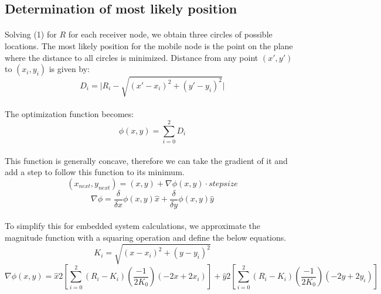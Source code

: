 \documentclass[10pt,letterpaper]{article}
\begin{document}
\subsection*{Determination of most likely position}
\paragraph*{}Solving (1) for $R$ for each receiver node, we obtain three circles of possible locations.  The most likely position for the mobile node is the point on the plane where the distance to all circles is minimized.  Distance from any point $(x',y')$ to $(x_{i},y_{i})$ is given by:
\begin{equation}
D_{i} = \vert R_{i} - \sqrt{ \left( x' - x_{i} \right)^{2} +\left( y' - y_{i} \right)^{2} } \vert
\end{equation}
\paragraph*{}The optimization function becomes:
\begin{equation}
\phi\left(x,y\right) = \sum_{i=0}^{2}D_{i}
\end{equation}
\paragraph*{}This function is generally concave, therefore we can take the gradient of it and add a step to follow this function to its minimum.
\begin{equation}
\left(x_{next},y_{next}\right) = (x,y) + \nabla\phi\left(x,y\right)\cdot stepsize
\end{equation}
\begin{equation}
\nabla\phi = \frac{\delta}{\delta x}\phi\left(x,y\right)\hat{x} + \frac{\delta}{\delta y}\phi\left(x,y\right)\hat{y}
\end{equation}
\paragraph*{}To simplify this for embedded system calculations, we approximate the magnitude function with a squaring operation and define the below equations.
\begin{equation}
K_{i} = \sqrt{\left(x-x_{i}\right)^{2} + \left(y-y_{i}\right)^{2}}
\end{equation}
\begin{equation}
\nabla\phi\left(x,y\right) = \hat{x}2\left[\sum_{i=0}^{2}\left(R_{i}-K_{i}\right)\left(\frac{-1}{2K_{0}}\right)\left(-2x+2x_{i}\right)\right] + \hat{y}2\left[\sum_{i=0}^{2}\left(R_{i}-K_{i}\right)\left(\frac{-1}{2K_{0}}\right)\left(-2y+2y_{i}\right)\right]
\end{equation}
\end{document}
